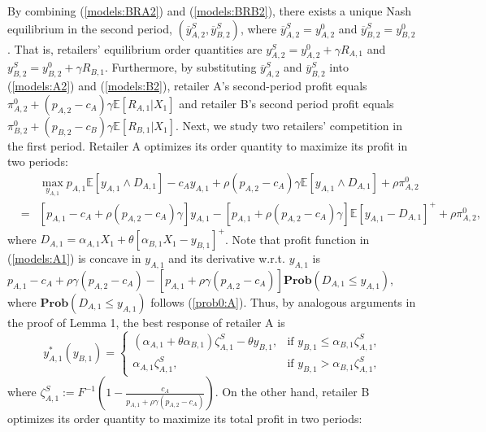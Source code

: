 \documentclass[nonblindrev,copyedit]{informs1}
\begin{document}
\begin{APPENDICES}
By combining (\ref{models:BRA2}) and (\ref{models:BRB2}), there exists a unique Nash equilibrium in the second period, $(\overline{y}^S_{A,2},\overline{y}^S_{B,2})$, where $\overline{y}^S_{A,2} = y^0_{A,2}$ and $\overline{y}^S_{B,2} = y^0_{B,2}$. That is, retailers' equilibrium order quantities are $y^S_{A,2} = y^0_{A,2} +\gamma R_{A,1}$ and $y^S_{B,2} = y^0_{B,2} +\gamma R_{B,1}$.
Furthermore, by substituting $\overline{y}^S_{A,2}$ and $\overline{y}^S_{B,2}$ into (\ref{models:A2}) and (\ref{models:B2}), retailer A's second-period profit equals $\pi^{0}_{A,2} + (p_{A,2} -c_A)\gamma \mathbb{E} \left[ R_{A,1} | X_1  \right]$ and retailer B's second period profit equals $\pi^{0}_{B,2} + (p_{B,2} -c_B)\gamma \mathbb{E} \left[ R_{B,1} | X_1  \right]$.
Next, we study two retailers' competition in the first period. Retailer A optimizes its order quantity to maximize its profit in two periods:
\begin{eqnarray}
    & & \max_{y_{A,1}} p_{A,1} \mathbb{E}\left[y_{A,1} \wedge D_{A,1}  \right] - c_A y_{A,1} + \rho (p_{A,2} -c_A)\gamma \mathbb{E} \left[y_{A,1} \wedge D_{A,1}  \right] + \rho \pi^{0}_{A,2} \nonumber \\
    & = & [p_{A,1} -c_A + \rho (p_{A,2} -c_A)\gamma]y_{A,1} - [p_{A,1}+\rho (p_{A,2} -c_A)\gamma] \mathbb{E} \left[y_{A,1} - D_{A,1}  \right]^+ + \rho \pi^{0}_{A,2}, \label{models:A1}
\end{eqnarray}
where $D_{A,1} = \alpha_{A,1} X_1 + \theta \left[\alpha_{B,1} X_1 - y_{B,1} \right]^+$. Note that profit function in (\ref{models:A1}) is concave in $y_{A,1}$ and its derivative w.r.t. $y_{A,1}$ is $p_{A,1} - c_A + \rho \gamma(p_{A,2} - c_A) - [p_{A,1} + \rho \gamma (p_{A,2} - c_A)] \mathbf{Prob} \left(D_{A,1} \leq y_{A,1} \right)$, where $\mathbf{Prob} \left(D_{A,1} \leq y_{A,1} \right)$ follows (\ref{prob0:A}). Thus, by analogous arguments in the proof of Lemma 1, the best response of retailer A is
\begin{equation} \label{models:BRA1}
    y^*_{A,1}(y_{B,1}) =  \begin{cases}
        (\alpha_{A,1} + \theta \alpha_{B,1}) \zeta^S_{A,1} - \theta y_{B,1}, &  \text{if $y_{B,1} \leq \alpha_{B,1} \zeta^S_{A,1}$,} \\
        \alpha_{A,1} \zeta^S_{A,1}, &  \text{if $y_{B,1} > \alpha_{B,1} \zeta^S_{A,1}$,}
    \end{cases}
\end{equation}
where $\zeta^S_{A,1} := F^{-1}(1 - \frac{c_A}{p_{A,1} + \rho \gamma (p_{A,2}-c_A)})$. On the other hand, retailer B optimizes its order quantity to maximize its total profit in two periods:

\end{APPENDICES}
\end{document}
